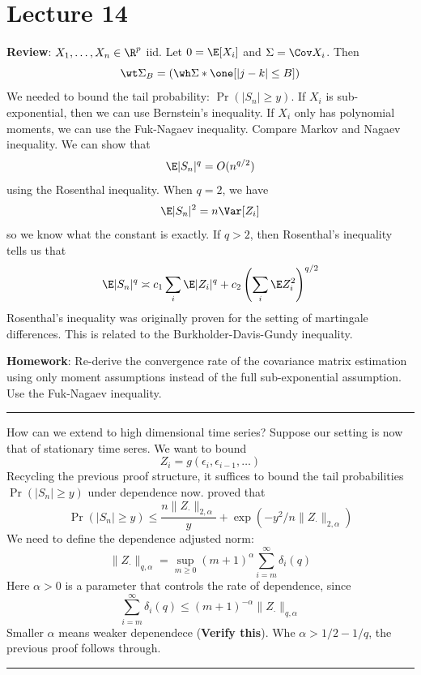 \section{Lecture 14}

\textbf{Review}: \(X_1, \dots, X_n \in \R^p\) iid. Let \(0 = \E[X_i]\) and \(\Sigma = \Cov X_i\). Then
\[\wt \Sigma_B = (\wh \Sigma * \one[|j - k| \leq B])\]
We needed to bound the tail probability: \(\Pr(|S_n| \geq y)\). If \(X_i\) is sub-exponential, then we can use Bernstein's inequality. If \(X_i\) only has polynomial moments, we can use the Fuk-Nagaev inequality. Compare Markov and Nagaev inequality. We can show that
\[\E |S_n|^q = O(n^{q/2})\]
using the Rosenthal inequality. When \(q = 2\), we have
\[\E |S_n|^2 = n \Var[Z_i]\]
so we know what the constant is exactly. If \(q > 2\), then Rosenthal's inequality tells us that
\[\E |S_n|^q \asymp c_1 \sum_i \E |Z_i|^q + c_2 \left(\sum_i \E Z_i^2\right)^{q/2}\]
Rosenthal's inequality was originally proven for the setting of martingale differences. This is related to the Burkholder-Davis-Gundy inequality.

\textbf{Homework}: Re-derive the convergence rate of the covariance matrix estimation using only moment assumptions instead of the full sub-exponential assumption. Use the Fuk-Nagaev inequality.

\begin{center}\rule{0.5\linewidth}{0.5pt}\end{center}

How can we extend to high dimensional time series? Suppose our setting is now that of stationary time seres. We want to bound
\[Z_i = g(\epsilon_i, \epsilon_{i-1}, \dots)\]
Recycling the previous proof structure, it suffices to bound the tail probabilities \(\Pr(|S_n| \geq y)\) under dependence now. \citet{WW16} proved that
\[\Pr(|S_n| \geq y) \leq \frac{n \| Z_{\cdot} \|_{2,\alpha}}{y} + \exp\left( -y^2/{n \| Z_{\cdot} \|_{2,\alpha}}  \right)\]
We need to define the dependence adjusted norm:
\[\|Z_{\cdot}\|_{q,\alpha} = \sup_{m \geq 0} (m + 1)^\alpha \sum_{i=m}^\infty \delta_i(q)\]
Here \(\alpha > 0\) is a parameter that controls the rate of dependence, since
\[\sum_{i=m}^\infty \delta_i(q) \leq (m + 1)^{-\alpha} \|Z_{\cdot}\|_{q,\alpha}\]
Smaller \(\alpha\) means weaker depenendece (\textbf{Verify this}). Whe \(\alpha > 1/2 - 1/q\), the previous proof follows through.

\begin{center}\rule{0.5\linewidth}{0.5pt}\end{center}

